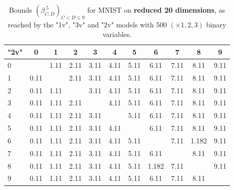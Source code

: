 \begin{table*}
\vspace{0.3cm}

	\begin{tabular}{|l||c|c|c|c|c|c|c|c|c|c|}\hline
		{\bf "2v"} & 0 & 1 & 2 & 3 & 4 & 5 & 6 & 7 & 8 & 9 \\\hline\hline
		0 &  & 1.11 & 2.11 & 3.11 & 4.11 & 5.11 & 6.11 & 7.11 & 8.11 & 9.11 \\\hline
		1 & 0.11 &  & 2.11 & 3.11 & 4.11 & 5.11 & 6.11 & 7.11 & 8.11 & 9.11 \\\hline
		2 & 0.11 & 1.11 & & 3.11 & 4.11 & 5.11 & 6.11 & 7.11 & 8.11 & 9.11 \\\hline
		3 & 0.11 & 1.11 & 2.11 & & 4.11 & 5.11 & 6.11 & 7.11 & 8.11 & 9.11 \\\hline
		4 & 0.11 & 1.11 & 2.11 & 3.11 & & 5.11 & 6.11 & 7.11 & 8.11 & 9.11 \\\hline
		5 & 0.11 & 1.11 & 2.11 & 3.11 & 4.11 & & 6.11 & 7.11 & 8.11 & 9.11 \\\hline
		6 & 0.11 & 1.11 & 2.11 & 3.11 & 4.11 & 5.11 & & 7.11 & 1.182 & 9.11 \\\hline
		7 & 0.11 & 1.11 & 2.11 & 3.11 & 4.11 & 5.11 & 6.11 & & 8.11 & 9.11 \\\hline
		8 & 0.11 & 1.11 & 2.11 & 3.11 & 4.11 & 5.11 & 1.182 & 7.11 &  & 9.11 \\\hline
		9 & 0.11 & 1.11 & 2.11 & 3.11 & 4.11 & 5.11 & 6.11 & 7.11 & 8.11 &  \\\hline
	\end{tabular}
	
	\caption{Bounds $(\beta^{.5}_{C,D})_{C < D \leq 9}$ 
	for MNIST on {\bf reduced 20 dimensions}, as reached by the "1v", "3v" and "2v" models
	with 500 $(\times 1,2,3)$ binary variables.}
    \label{table.pair}
\end{table*}
